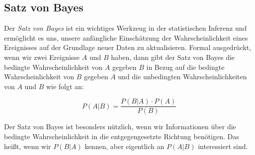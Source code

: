 
\subsection{Satz von Bayes}

Der \textit{Satz von Bayes} ist ein wichtiges Werkzeug in der statistischen Inferenz und ermöglicht es uns, unsere anfängliche Einschätzung der Wahrscheinlichkeit eines Ereignisses auf der Grundlage neuer Daten zu aktualisieren.
\newline \newline
Formal ausgedrückt, wenn wir zwei Ereignisse $A$ und $B$ haben, dann gibt der Satz von Bayes die bedingte Wahrscheinlichkeit von $A$ gegeben $B$ in Bezug auf die bedingte Wahrscheinlichkeit von $B$ gegeben $A$ und die unbedingten Wahrscheinlichkeiten von $A$ und $B$ wie folgt an:

\begin{equation}
    P(A|B) = \frac{P(B|A) \cdot P(A)}{P(B)}
\end{equation}

Der Satz von Bayes ist besonders nützlich, wenn wir Informationen über die bedingte Wahrscheinlichkeit in die entgegengesetzte Richtung benötigen.
Das heißt, wenn wir $P(B|A)$ kennen, aber eigentlich an $P(A|B)$ interessiert sind.

